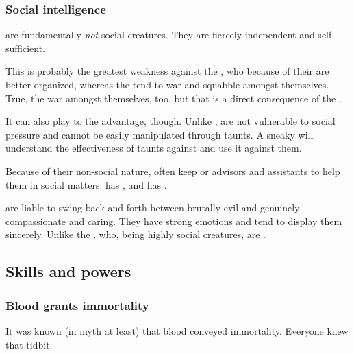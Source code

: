 \subsubsection{Social intelligence}
\Dragons{} are fundamentally \emph{not} social creatures. 
They are fiercely independent and self-sufficient. 

This is probably the \psp{\dragons}{} greatest weakness against the \resphain, who because of their  are better organized, whereas the \dragons{} tend to war and squabble amongst themselves. 
True, the \resphain{} war amongst themselves, too, but that is a direct consequence of the . 

It can also play to the \psp{\dragons}{} advantage, though. 
Unlike \resphain, \dragons{} are not vulnerable to social pressure and cannot be easily manipulated through taunts. 
A sneaky \dragon{} will understand the effectiveness of taunts against \resphain{} and use it against them. 

Because of their non-social nature, \dragonlords{} often keep \scathaese{} or  advisors and assistants to help them in social matters. 
\Secherdamon{} has \LocarPsyrex, and \Ishnaruchaefir{} has \Criseis. 

\Dragons{} are liable to swing back and forth between brutally evil and genuinely compassionate and caring. 
They have strong emotions and tend to display them sincerely. 
Unlike the \resphain{}, who, being highly social creatures, are . 










\subsection{Skills and powers}





\subsubsection{Blood grants immortality}
It was known (in myth at least) that \draconian blood conveyed immortality.
Everyone knew that tidbit.

